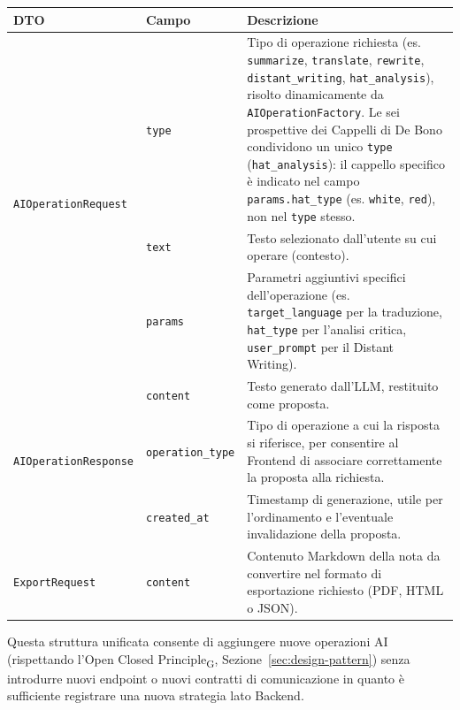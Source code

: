 \renewcommand{\arraystretch}{1.3}
\begin{center}
\begin{tabular}{l l p{7cm}}
	\toprule
	\textbf{DTO} & \textbf{Campo} & \textbf{Descrizione} \\
	\midrule
	\multirow{3}{*}{\texttt{AIOperationRequest}}
	 & \texttt{type} & Tipo di operazione richiesta (es. \texttt{summarize}, \texttt{translate}, \texttt{rewrite}, \texttt{distant\_writing}, \texttt{hat\_analysis}), risolto dinamicamente da \texttt{AIOperationFactory}. Le sei prospettive dei Cappelli di De Bono condividono un unico \texttt{type} (\texttt{hat\_analysis}): il cappello specifico è indicato nel campo \texttt{params.hat\_type} (es. \texttt{white}, \texttt{red}), non nel \texttt{type} stesso. \\
	 & \texttt{text} & Testo selezionato dall'utente su cui operare (contesto). \\
	 & \texttt{params} & Parametri aggiuntivi specifici dell'operazione (es. \texttt{target\_language} per la traduzione, \texttt{hat\_type} per l'analisi critica, \texttt{user\_prompt} per il Distant Writing). \\
	\midrule
	\multirow{3}{*}{\texttt{AIOperationResponse}}
	 & \texttt{content} & Testo generato dall'LLM, restituito come proposta. \\
	 & \texttt{operation\_type} & Tipo di operazione a cui la risposta si riferisce, per consentire al Frontend di associare correttamente la proposta alla richiesta. \\
	 & \texttt{created\_at} & Timestamp di generazione, utile per l'ordinamento e l'eventuale invalidazione della proposta. \\
	\midrule
	\texttt{ExportRequest} & \texttt{content} & Contenuto Markdown della nota da convertire nel formato di esportazione richiesto (PDF, HTML o JSON). \\
	\bottomrule
\end{tabular}
\end{center}

Questa struttura unificata consente di aggiungere nuove operazioni AI (rispettando l'Open Closed Principle\textsubscript{G}, Sezione~\ref{sec:design-pattern}) senza introdurre nuovi endpoint o nuovi contratti di comunicazione in quanto è sufficiente registrare una nuova strategia lato Backend.

